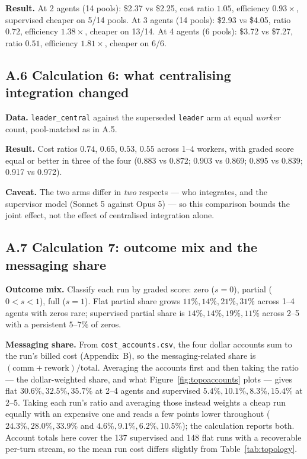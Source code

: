 \documentclass[11pt,a4paper]{article}
\begin{document}
\textbf{Result.} At 2 agents (14 pools): \$2.37 vs \$2.25, cost ratio $1.05$, efficiency $0.93\times$, supervised cheaper on 5/14 pools. At 3 agents (14 pools): \$2.93 vs \$4.05, ratio $0.72$, efficiency $1.38\times$, cheaper on 13/14. At 4 agents (6 pools): \$3.72 vs \$7.27, ratio $0.51$, efficiency $1.81\times$, cheaper on 6/6.

\subsection*{A.6 \quad Calculation 6: what centralising integration changed}

\textbf{Data.} \texttt{leader\_central} against the superseded \texttt{leader} arm at equal \emph{worker} count, pool-matched as in A.5.

\textbf{Result.} Cost ratios $0.74$, $0.65$, $0.53$, $0.55$ across 1--4 workers, with graded score equal or better in three of the four (0.883 vs 0.872; 0.903 vs 0.869; 0.895 vs 0.839; 0.917 vs 0.972).

\textbf{Caveat.} The two arms differ in \emph{two} respects --- who integrates, and the supervisor model (Sonnet 5 against Opus 5) --- so this comparison bounds the joint effect, not the effect of centralised integration alone.

\subsection*{A.7 \quad Calculation 7: outcome mix and the messaging share}

\textbf{Outcome mix.} Classify each run by graded score: zero ($s = 0$), partial ($0 < s < 1$), full ($s = 1$). Flat partial share grows $11\%, 14\%, 21\%, 31\%$ across 1--4 agents with zeros rare; supervised partial share is $14\%, 14\%, 19\%, 11\%$ across 2--5 with a persistent $5$--$7\%$ of zeros.

\textbf{Messaging share.} From \texttt{cost\_accounts.csv}, the four dollar accounts sum to the run's billed cost (Appendix~B), so the messaging-related share is $(\text{comm} + \text{rework}) / \text{total}$. Averaging the accounts first and then taking the ratio --- the dollar-weighted share, and what Figure~\ref{fig:topoaccounts} plots --- gives flat $30.6\%, 32.5\%, 35.7\%$ at 2--4 agents and supervised $5.4\%, 10.1\%, 8.3\%, 15.4\%$ at 2--5. Taking each run's ratio and averaging those instead weights a cheap run equally with an expensive one and reads a few points lower throughout ($24.3\%, 28.0\%, 33.9\%$ and $4.6\%, 9.1\%, 6.2\%, 10.5\%$); the calculation reports both. Account totals here cover the 137 supervised and 148 flat runs with a recoverable per-turn stream, so the mean run cost differs slightly from Table~\ref{tab:topology}.
\end{document}
